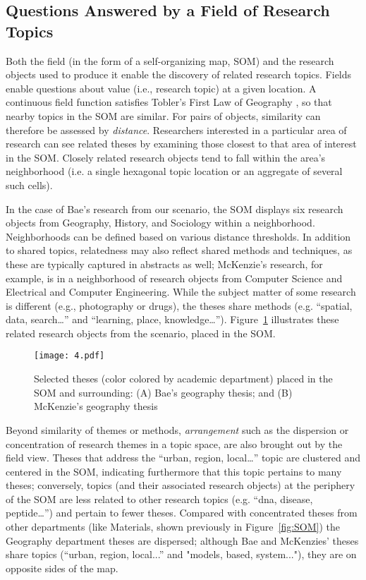 \documentclass[a4paper,UKenglish]{lipics-v2018}
\begin{document}
\subsection{Questions Answered by a Field of Research Topics}
Both the field (in the form of a self-organizing map, SOM) and the research objects used to produce it enable the discovery of related research topics. Fields enable questions about value (i.e., research topic) at a given location. A continuous field function satisfies Tobler's First Law of Geography \cite{tobler1970computer}, so that nearby topics in the SOM are similar. For pairs of objects, similarity can therefore be assessed by \textit{distance}. Researchers interested in a particular area of research can see related theses by examining those closest to that area of interest in the SOM. Closely related research objects tend to fall within the area's neighborhood (i.e. a single hexagonal topic location or an aggregate of several such cells).

In the case of Bae’s research from our scenario, the SOM displays six research objects from Geography, History, and Sociology within a neighborhood. Neighborhoods can be defined based on various distance thresholds. In addition to shared topics, relatedness may also reflect shared methods and techniques, as these are typically captured in abstracts as well; McKenzie’s research, for example, is in a neighborhood of research objects from Computer Science and Electrical and Computer Engineering. While the subject matter of some research is different (e.g., photography or drugs), the theses share methods (e.g. “spatial, data, search…” and “learning, place, knowledge…”). Figure~\ref{fig:ex_SOM} illustrates these related research objects from the scenario, placed in the SOM.

\begin{figure}[ht]
    \centering
    \texttt{[image: 4.pdf]}
    \caption{Selected theses (color colored by academic department) placed in the SOM and surrounding: (A) Bae's geography thesis; and (B) McKenzie's geography thesis}
    \label{fig:ex_SOM}
\end{figure}

Beyond similarity of themes or methods, \textit{arrangement} such as the dispersion or concentration of research themes in a topic space, are also brought out by the field view. Theses that address the “urban, region, local…” topic are clustered and centered in the SOM, indicating furthermore that this topic pertains to many theses; conversely, topics (and their associated research objects) at the periphery of the SOM are less related to other research topics (e.g. “dna, disease, peptide…”) and pertain to fewer theses. Compared with concentrated theses from other departments (like Materials, shown previously in Figure~\ref{fig:SOM}) the Geography department theses are dispersed; although Bae and McKenzies’ theses share topics (“urban, region, local...” and "models, based, system..."), they are on opposite sides of the map. 
\end{document}
